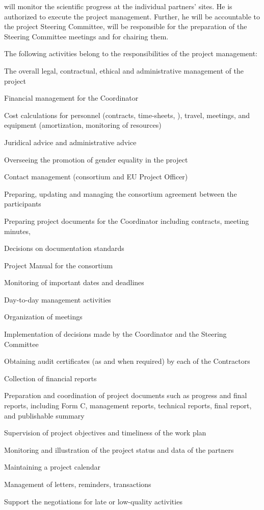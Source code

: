 \Coordinator{} will monitor the scientific progress at the
individual partners' sites. He is authorized to execute the project management. Further, he will be accountable to
the project Steering Committee, will be responsible for the
preparation of the Steering Committee meetings and for chairing them.

The following activities belong to the responsibilities of the project
management:
\begin{denseItemize}
  \item The overall legal, contractual, ethical and administrative
  management of the project
  \item Financial management for the Coordinator
  \item Cost calculations for personnel (contracts, time-sheets, \etc), travel, meetings, and equipment (amortization, monitoring of resources)
  \item Juridical advice and administrative advice
  \item Overseeing the promotion of gender equality in the project
  \item Contact management (consortium and EU Project Officer)
  \item Preparing, updating and managing the consortium agreement
    between the participants
  \item Preparing project documents for the Coordinator including
    contracts, meeting minutes, \etc
  \item Decisions on documentation standards
  \item Project Manual for the consortium
  \item Monitoring of important dates and deadlines
  \item Day-to-day management activities
  \item Organization of meetings
  \item Implementation of decisions made by the Coordinator and the
    Steering Committee
  \item Obtaining audit certificates (as and when required) by each of
    the Contractors
  \item Collection of financial reports
  \item Preparation and coordination of project documents such as
    progress and final reports, including Form C, management reports, technical reports, final report, and publishable summary
  \item Supervision of project objectives and timeliness of the work plan
  \item Monitoring and illustration of the project status and data of the partners
  \item Maintaining a project calendar
  \item Management of letters, reminders, transactions
  \item Support the negotiations for late or low-quality activities
\end{denseItemize}


